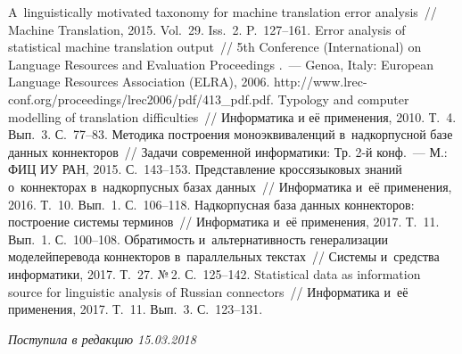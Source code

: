 \begin{multicols}{2}
{{\begin{thebibliography}{99}
 A~linguistically motivated taxonomy for machine 
translation error analysis~// Machine Translation, 2015. Vol.~29. Iss.~2.  
P.~127--161.
 Error analysis of statistical machine 
translation output~// 5th Conference (International) on Language Resources and 
Evaluation Proceedings .~--- Genoa, Italy: European Language Resources 
Association (ELRA), 2006. {\sf  
http://www.lrec-conf.org/proceedings/lrec2006/pdf/413\_pdf.pdf}.
 Typology and 
computer modelling of translation difficulties~// Информатика и её 
применения, 2010. Т.~4. Вып.~3. С.~77--83.
Методика построения моноэквиваленций в~надкорпусной базе данных 
коннекторов~// Задачи современной информатики: Тр. 2-й конф.~--- М.: 
ФИЦ ИУ РАН, 2015. С.~143--153.
Представление кроссязыковых знаний о~коннекторах в~надкорпусных 
базах данных~// Информатика и~её применения, 2016. Т.~10. Вып.~1. 
С.~106--118.
 Надкорпусная 
база данных коннекторов: построение сис\-те\-мы терминов~// Информатика 
и~её применения, 2017. Т.~11. Вып.~1. С.~100--108.
 Об\-ра\-тимость 
и~альтернативность генерализации моделей\linebreak перевода коннекторов 
в~параллельных текстах~// Сис\-те\-мы и~средства информатики, 2017. Т.~27. 
№\,2. С.~125--142.
 Statistical data as information source for 
linguistic analysis of Russian connectors~// Информатика и~её применения, 
2017. Т.~11. Вып.~3. С.~123--131.




\end{thebibliography}
} }

\end{multicols}

 \label{end\stat}

 \vspace*{-3pt}

\hfill{\small\textit{Поступила в редакцию  15.03.2018}}


\renewcommand{\figurename}{\protect\bf Рис.}
\renewcommand{\tablename}{\protect\bf Таблица}